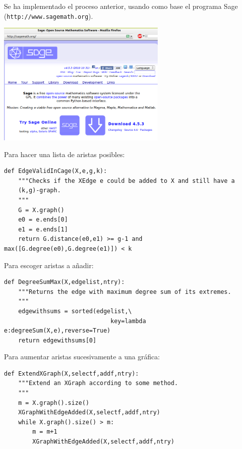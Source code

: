 \documentclass[spanish]{beamer}
\renewcommand{\(}{\bigl(}
\renewcommand{\)}{\bigr)}
\theoremstyle{definition}
\newenvironment{imageframervf}[1]
	{
          \setbeamertemplate{background}{%
              \parbox[c][\paperheight]{\paperwidth}{%
                \texttt{[image: \#1]}
                }
            }
		\begin{frame}
		\color{white}
	}{\end{frame}}
\begin{document}
\begin{imageframervf}{paper}
\begin{frame}
  Se ha implementado el proceso anterior, usando como base el programa
  \textsf{Sage} (\texttt{http://www.sagemath.org}).
  \begin{center}
    \includegraphics[height=6cm]{sagepage}
  \end{center}
\end{frame}

\begin{frame}[fragile]
  Para hacer una lista de aristas posibles:

  \bigskip
  
  \begin{verbatim}
def EdgeValidInCage(X,e,g,k):
    """Checks if the XEdge e could be added to X and still have a
    (k,g)-graph.
    """
    G = X.graph()
    e0 = e.ends[0]
    e1 = e.ends[1]
    return G.distance(e0,e1) >= g-1 and max([G.degree(e0),G.degree(e1)]) < k    
  \end{verbatim}
\end{frame}

\begin{frame}[fragile]
  Para escoger aristas a añadir:

  \bigskip
  
  \begin{verbatim}
def DegreeSumMax(X,edgelist,ntry):
    """Returns the edge with maximum degree sum of its extremes.
    """
    edgewithsums = sorted(edgelist,\
                              key=lambda e:degreeSum(X,e),reverse=True)
    return edgewithsums[0]
  \end{verbatim}
\end{frame}

\begin{frame}[fragile]
  Para aumentar aristas sucesivamente a una gráfica:

  \bigskip
  
  \begin{verbatim}
def ExtendXGraph(X,selectf,addf,ntry):
    """Extend an XGraph according to some method.
    """
    m = X.graph().size()
    XGraphWithEdgeAdded(X,selectf,addf,ntry)
    while X.graph().size() > m:
        m = m+1
        XGraphWithEdgeAdded(X,selectf,addf,ntry)
  \end{verbatim}
\end{frame}


\end{imageframervf}
\end{document}
